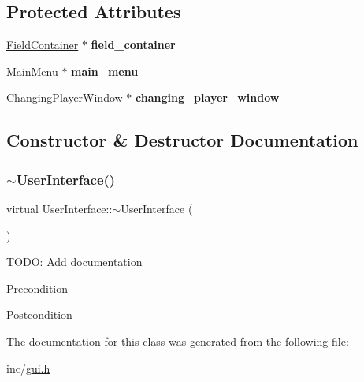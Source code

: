 \subsection*{Protected Attributes}
\begin{DoxyCompactItemize}
\item 
\mbox{\label{classUserInterface_a478bf2a26aef4f0e613e6f632460411b}} 
\mbox{\hyperlink{classFieldContainer}{Field\+Container}} $\ast$ {\bfseries field\+\_\+container}
\item 
\mbox{\label{classUserInterface_a6203a657f8befd5a726cdd0fb4c465c2}} 
\mbox{\hyperlink{classMainMenu}{Main\+Menu}} $\ast$ {\bfseries main\+\_\+menu}
\item 
\mbox{\label{classUserInterface_a12e1556de0d8f64ce06b0e312d801232}} 
\mbox{\hyperlink{classChangingPlayerWindow}{Changing\+Player\+Window}} $\ast$ {\bfseries changing\+\_\+player\+\_\+window}
\end{DoxyCompactItemize}


\subsection{Constructor \& Destructor Documentation}
\mbox{\label{classUserInterface_a7b1a866c59dbeabdd3f9ae639bc88fad}} 
\subsubsection{\texorpdfstring{$\sim$UserInterface()}{~UserInterface()}}
{\footnotesize\ttfamily virtual User\+Interface\+::$\sim$\+User\+Interface (\begin{DoxyParamCaption}{ }\end{DoxyParamCaption})\hspace{0.3cm}{\ttfamily [virtual]}}

T\+O\+DO\+: Add documentation \begin{DoxyPrecond}{Precondition}

\end{DoxyPrecond}
\begin{DoxyPostcond}{Postcondition}

\end{DoxyPostcond}


The documentation for this class was generated from the following file\+:\begin{DoxyCompactItemize}
\item 
inc/\mbox{\hyperlink{gui_8h}{gui.\+h}}\end{DoxyCompactItemize}
